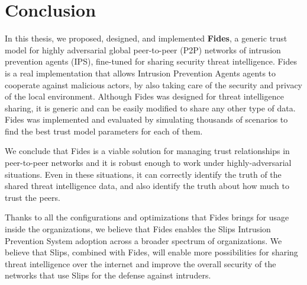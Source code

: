 \chapter{Conclusion}
\label{ch:conclusion}

In this thesis, we proposed, designed, and implemented \textbf{Fides}, a generic trust model for highly adversarial global peer-to-peer (P2P) networks of intrusion prevention agents (IPS), fine-tuned for sharing security threat intelligence. Fides is a real implementation that allows Intrusion Prevention Agents agents to cooperate against malicious actors, by also taking care of the security and privacy of the local environment. 
Although Fides was designed for threat intelligence sharing, it is generic and can be easily modified to share any other type of data. Fides was implemented and evaluated by simulating thousands of scenarios to find the best trust model parameters for each of them.

We conclude that Fides is a viable solution for managing trust relationships in peer-to-peer networks and it is robust enough to work under highly-adversarial situations. Even in these situations, it can correctly identify the truth of the shared threat intelligence data, and also identify the truth about how much to trust the peers.

Thanks to all the configurations and optimizations that Fides brings for usage inside the organizations, we believe that Fides enables the Slips Intrusion Prevention System adoption across a broader spectrum of organizations.
We believe that Slips, combined with Fides, will enable more possibilities for sharing threat intelligence over the internet and improve the overall security of the networks that use Slips for the defense against intruders.



